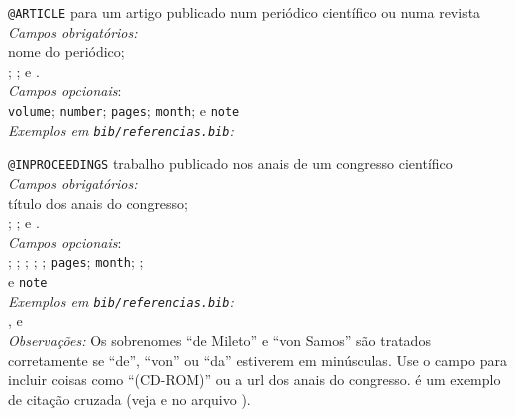 \begin{alineas}
		\item \verb|@ARTICLE| para um artigo publicado num periódico
			científico ou numa revista\\
		\emph{Campos obrigatórios:}\\
 			  nome do periódico;\\
 			\hspace*{1em}; ; e .\\
		\emph{Campos opcionais}:\\
			\hspace*{1em}\texttt{volume}; \texttt{number}; 
			\texttt{pages}; \texttt{month}; e \texttt{note}\\
		\emph{Exemplos em \texttt{bib/referencias.bib}:} \\
			\cite{huey03}
			
	\item \verb|@INPROCEEDINGS| trabalho publicado nos anais de
			um congresso científico\\
		\emph{Campos obrigatórios:}\\
 			  título dos anais do congresso;\\
 			\hspace*{1em}; ; e .\\
		\emph{Campos opcionais}:\\
			 \hspace*{1em}; ; ; ; 
			 ; 
			\texttt{pages}; \texttt{month}; ;\\
			\hspace*{1em} e \texttt{note}\\
		\emph{Exemplos em \texttt{bib/referencias.bib}:} \\
			\cite{mil2009},  e \cite{aut:06} \\
		\emph{Observações:} Os sobrenomes ``de Mileto'' e ``von Samos''
		são tratados corretamente se ``de'', ``von'' ou ``da'' estiverem
		em minúsculas. Use o campo  para incluir
		coisas como ``(CD-ROM)'' ou a url dos anais do congresso. 
		 é um exemplo de citação cruzada
		(veja  e  no arquivo ). 
			

\end{alineas}
